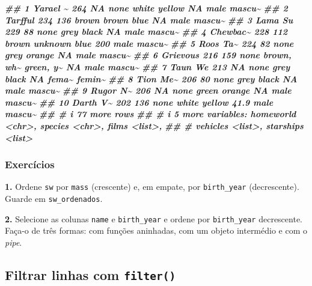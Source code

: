 \documentclass[
  portuguese,
  11pt,
  openany]{book}
\newenvironment{Shaded}{\begin{snugshade}}{\end{snugshade}}
\newcommand{\DocumentationTok}[1]{\textcolor[rgb]{0.56,0.35,0.01}{\textbf{\textit{#1}}}}
\newcounter{none} %
\begin{document}
\begin{Shaded}
\begin{Highlighting}[]
\DocumentationTok{\#\#  1 Yarael \textasciitilde{}    264    NA none       white      yellow          NA   male  mascu\textasciitilde{}}
\DocumentationTok{\#\#  2 Tarfful     234   136 brown      brown      blue            NA   male  mascu\textasciitilde{}}
\DocumentationTok{\#\#  3 Lama Su     229    88 none       grey       black           NA   male  mascu\textasciitilde{}}
\DocumentationTok{\#\#  4 Chewbac\textasciitilde{}    228   112 brown      unknown    blue           200   male  mascu\textasciitilde{}}
\DocumentationTok{\#\#  5 Roos Ta\textasciitilde{}    224    82 none       grey       orange          NA   male  mascu\textasciitilde{}}
\DocumentationTok{\#\#  6 Grievous    216   159 none       brown, wh\textasciitilde{} green, y\textasciitilde{}       NA   male  mascu\textasciitilde{}}
\DocumentationTok{\#\#  7 Taun We     213    NA none       grey       black           NA   fema\textasciitilde{} femin\textasciitilde{}}
\DocumentationTok{\#\#  8 Tion Me\textasciitilde{}    206    80 none       grey       black           NA   male  mascu\textasciitilde{}}
\DocumentationTok{\#\#  9 Rugor N\textasciitilde{}    206    NA none       green      orange          NA   male  mascu\textasciitilde{}}
\DocumentationTok{\#\# 10 Darth V\textasciitilde{}    202   136 none       white      yellow          41.9 male  mascu\textasciitilde{}}
\DocumentationTok{\#\# \# i 77 more rows}
\DocumentationTok{\#\# \# i 5 more variables: homeworld \textless{}chr\textgreater{}, species \textless{}chr\textgreater{}, films \textless{}list\textgreater{},}
\DocumentationTok{\#\# \#   vehicles \textless{}list\textgreater{}, starships \textless{}list\textgreater{}}
\end{Highlighting}
\end{Shaded}

\subsubsection{Exercícios}\label{exercuxedcios-16}

\textbf{1.} Ordene \texttt{sw} por \texttt{mass} (crescente) e, em empate, por \texttt{birth\_year}
(decrescente). Guarde em \texttt{sw\_ordenados}.

\textbf{2.} Selecione as colunas \texttt{name} e \texttt{birth\_year} e ordene por \texttt{birth\_year}
decrescente. Faça-o de três formas: com funções aninhadas, com um objeto intermédio e
com o \emph{pipe}.

\subsection{\texorpdfstring{Filtrar linhas com \texttt{filter()}}{Filtrar linhas com filter()}}\label{filtrar-linhas-com-filter}
\end{document}
